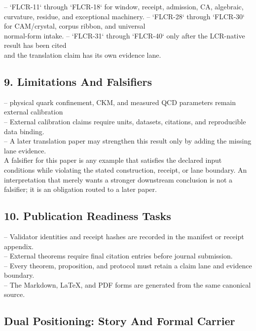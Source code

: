 \documentclass[11pt]{article}
\begin{document}
\noindent{}-- `FLCR-11` through `FLCR-18` for window, receipt, admission, CA, algebraic,\\
  curvature, residue, and exceptional machinery.
\noindent{}-- `FLCR-28` through `FLCR-30` for CAM/crystal, corpus ribbon, and universal\\
  normal-form intake.
\noindent{}-- `FLCR-31` through `FLCR-40` only after the LCR-native result has been cited\\
  and the translation claim has its own evidence lane.

\subsection*{9. Limitations And Falsifiers}

\noindent{}-- physical quark confinement, CKM, and measured QCD parameters remain external calibration\\
\noindent{}-- External calibration claims require units, datasets, citations, and reproducible data binding.\\
\noindent{}-- A later translation paper may strengthen this result only by adding the missing lane evidence.\\

A falsifier for this paper is any example that satisfies the declared input
conditions while violating the stated construction, receipt, or lane boundary.
An interpretation that merely wants a stronger downstream conclusion is not a
falsifier; it is an obligation routed to a later paper.

\subsection*{10. Publication Readiness Tasks}

\noindent{}-- Validator identities and receipt hashes are recorded in the manifest or receipt appendix.\\
\noindent{}-- External theorems require final citation entries before journal submission.\\
\noindent{}-- Every theorem, proposition, and protocol must retain a claim lane and evidence boundary.\\
\noindent{}-- The Markdown, LaTeX, and PDF forms are generated from the same canonical source.\\

\subsection*{Dual Positioning: Story And Formal Carrier}
\end{document}
